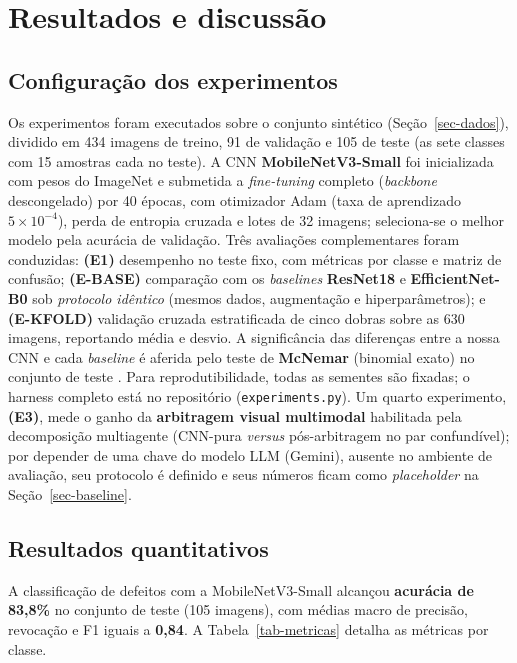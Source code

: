 \documentclass[
	article,			%
	11pt,				%
	oneside,			%
	a4paper,			%
	english,			%
	brazilian,			%
	sumario=tradicional
	]{abntex2}
\begin{document}
\section{Resultados e discussão}\label{sec-resultados}

\subsection{Configuração dos experimentos}

Os experimentos foram executados sobre o conjunto sintético (Seção~\ref{sec-dados}),
dividido em 434 imagens de treino, 91 de validação e 105 de teste (as sete classes
com 15 amostras cada no teste). A CNN \textbf{MobileNetV3-Small} foi inicializada com
pesos do ImageNet e submetida a \textit{fine-tuning} completo (\textit{backbone}
descongelado) por 40 épocas, com otimizador Adam (taxa de aprendizado
$5\times10^{-4}$), perda de entropia cruzada e lotes de 32 imagens; seleciona-se o
melhor modelo pela acurácia de validação. Três avaliações complementares foram
conduzidas: \textbf{(E1)} desempenho no teste fixo, com métricas por classe e matriz
de confusão; \textbf{(E-BASE)} comparação com os \textit{baselines} \textbf{ResNet18}
e \textbf{EfficientNet-B0} sob \emph{protocolo idêntico} (mesmos dados, augmentação e
hiperparâmetros); e \textbf{(E-KFOLD)} validação cruzada estratificada de cinco
dobras sobre as 630 imagens, reportando média e desvio. A significância das
diferenças entre a nossa CNN e cada \textit{baseline} é aferida pelo teste de
\textbf{McNemar} (binomial exato) no conjunto de teste \cite{dietterich1998tests}.
Para reprodutibilidade, todas as sementes são fixadas; o harness completo está no
repositório (\texttt{experiments.py}). Um quarto experimento, \textbf{(E3)},
mede o ganho da \textbf{arbitragem visual multimodal} habilitada pela decomposição
multiagente (CNN-pura \textit{versus} pós-arbitragem no par confundível); por
depender de uma chave do modelo LLM (Gemini), ausente no ambiente de avaliação,
seu protocolo é definido e seus números ficam como \textit{placeholder} na
Seção~\ref{sec-baseline}.

\subsection{Resultados quantitativos}

A classificação de defeitos com a MobileNetV3-Small alcançou \textbf{acurácia de
83,8\%} no conjunto de teste (105 imagens), com médias macro de precisão, revocação e
F1 iguais a \textbf{0,84}. A Tabela~\ref{tab-metricas} detalha as métricas por classe.
\end{document}

